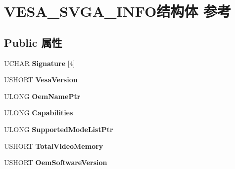 \hypertarget{struct_v_e_s_a___s_v_g_a___i_n_f_o}{}\section{V\+E\+S\+A\+\_\+\+S\+V\+G\+A\+\_\+\+I\+N\+F\+O结构体 参考}
\label{struct_v_e_s_a___s_v_g_a___i_n_f_o}
\subsection*{Public 属性}
\begin{DoxyCompactItemize}
\item 
\mbox{\label{struct_v_e_s_a___s_v_g_a___i_n_f_o_a15ae3e3004d0f3a2d71823ee047ec128}} 
U\+C\+H\+AR {\bfseries Signature} \mbox{[}4\mbox{]}
\item 
\mbox{\label{struct_v_e_s_a___s_v_g_a___i_n_f_o_a19548b6f2ba28ee0bc0e2f437be56c3c}} 
U\+S\+H\+O\+RT {\bfseries Vesa\+Version}
\item 
\mbox{\label{struct_v_e_s_a___s_v_g_a___i_n_f_o_acae72024e3367b8e5a293cb7530a60ef}} 
U\+L\+O\+NG {\bfseries Oem\+Name\+Ptr}
\item 
\mbox{\label{struct_v_e_s_a___s_v_g_a___i_n_f_o_a525b68d66f6103e03e9cb5782a863a04}} 
U\+L\+O\+NG {\bfseries Capabilities}
\item 
\mbox{\label{struct_v_e_s_a___s_v_g_a___i_n_f_o_ad4271f2d6b0ce266a97cf5827d54d1a6}} 
U\+L\+O\+NG {\bfseries Supported\+Mode\+List\+Ptr}
\item 
\mbox{\label{struct_v_e_s_a___s_v_g_a___i_n_f_o_a3d6afe1203ee421867010bba79929565}} 
U\+S\+H\+O\+RT {\bfseries Total\+Video\+Memory}
\item 
\mbox{\label{struct_v_e_s_a___s_v_g_a___i_n_f_o_a7f7cfcd21e4b7d37603ecb34364443cf}} 
U\+S\+H\+O\+RT {\bfseries Oem\+Software\+Version}
\item 
\mbox{\label{struct_v_e_s_a___s_v_g_a___i_n_f_o_a42448d42436070e5f15c58b307480d87}} 

\end{DoxyCompactItemize}
